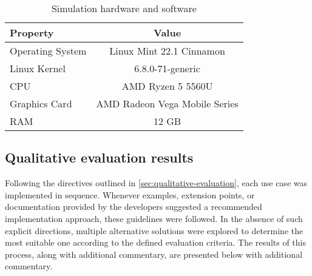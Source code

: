 \documentclass[twoside, 11pt]{article}
\begin{document}
\begin{table}[h]
  \begin{center}
    \begin{tabular}{ | l | c | } 
      \hline
      Property & Value \\ 
      \hline 
      Operating System & Linux Mint 22.1 Cinnamon \\
      \hline
      Linux Kernel & 6.8.0-71-generic \\
      \hline
      CPU & AMD Ryzen 5 5560U \\
      \hline
      Graphics Card & AMD Radeon Vega Mobile Series \\
      \hline
      RAM & 12 GB \\
      \hline
    \end{tabular}
    \caption{Simulation hardware and software}
    \label{table:pc-specs}
  \end{center}
\end{table}


\subsection{Qualitative evaluation results}

Following the directives outlined in \autoref{sec:qualitative-evaluation}, each use case was implemented in sequence. Whenever examples, extension points, or documentation provided by the developers suggested a recommended implementation approach, these guidelines were followed. In the absence of such explicit directions, multiple alternative solutions were explored to determine the most suitable one according to the defined evaluation criteria. The results of this process, along with additional commentary, are presented below with additional commentary.
\end{document}
